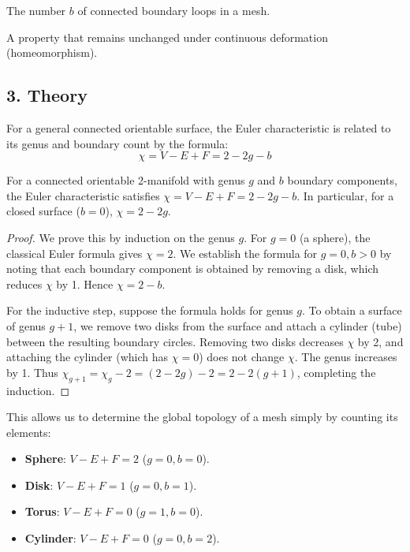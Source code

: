 \begin{definition}\label{def:boundary_components}
The number $b$ of connected boundary loops in a mesh.
\end{definition}

\begin{definition}\label{def:topological_invariant}
A property that remains unchanged under continuous deformation (homeomorphism).
\end{definition}

\subsection{3. Theory}

For a general connected orientable surface, the Euler characteristic is related to its genus and boundary count by the formula:
$$\chi = V - E + F = 2 - 2g - b$$

\begin{theorem}\label{thm:euler_poincare}
For a connected orientable 2-manifold with genus $g$ and $b$ boundary components, the Euler characteristic satisfies $\chi = V - E + F = 2 - 2g - b$. In particular, for a closed surface ($b = 0$), $\chi = 2 - 2g$.
\end{theorem}

\begin{proof}
We prove this by induction on the genus $g$. For $g = 0$ (a sphere), the classical Euler formula gives $\chi = 2$. We establish the formula for $g = 0, b > 0$ by noting that each boundary component is obtained by removing a disk, which reduces $\chi$ by 1. Hence $\chi = 2 - b$.

For the inductive step, suppose the formula holds for genus $g$. To obtain a surface of genus $g+1$, we remove two disks from the surface and attach a cylinder (tube) between the resulting boundary circles. Removing two disks decreases $\chi$ by 2, and attaching the cylinder (which has $\chi = 0$) does not change $\chi$. The genus increases by 1. Thus $\chi_{g+1} = \chi_g - 2 = (2 - 2g) - 2 = 2 - 2(g+1)$, completing the induction.
\end{proof}

This allows us to determine the global topology of a mesh simply by counting its elements:
\begin{itemize}
    \item \textbf{Sphere}: $V - E + F = 2$ ($g=0, b=0$).
    \item \textbf{Disk}: $V - E + F = 1$ ($g=0, b=1$).
    \item \textbf{Torus}: $V - E + F = 0$ ($g=1, b=0$).
    \item \textbf{Cylinder}: $V - E + F = 0$ ($g=0, b=2$).
\end{itemize}

